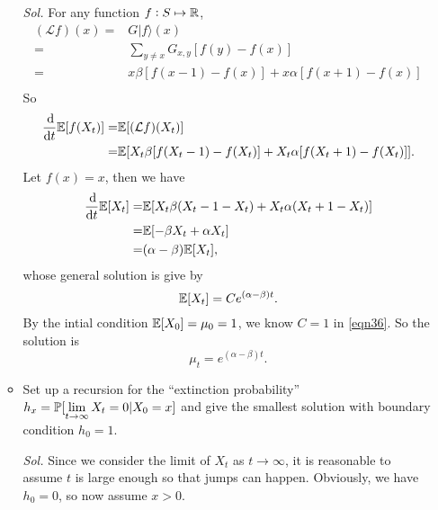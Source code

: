 \begin{enumerate}
\begin{itemize}
        \textit{ Sol. } For any function $f: S \mapsto \mathbb{R}$, 
        \begin{align*}
            (\mathcal{L}f)(x) = & G | f \rangle (x) \\ 
            = & \sum_{y \neq x} G_{x,y} [f(y) - f(x)] \\ 
            = & x \beta [f(x-1) - f(x)] + x \alpha [f(x+1) - f(x)] \\ 
        \end{align*}
        So 
        \begin{align*}
            \frac{\dif}{\dif t} \mbb{E} [f(X_t)] = & \mbb{E} [(\mathcal{L}f)(X_t)] \\ 
            = & \mbb{E} [X_t\beta [f(X_t - 1) - f(X_t)] + X_t \alpha [f(X_t + 1) - f(X_t)]].
        \end{align*}
        Let $f(x) = x$, then we have 
        \begin{align*}
            \frac{\dif}{\dif t} \mbb{E} [X_t] = & \mbb{E} [X_t \beta ( X_t - 1 - X_t) + X_t \alpha (X_t + 1 - X_t)] \\ 
            = & \mbb{E} [- \beta X_t + \alpha X_t] \\ 
            = & (\alpha - \beta)\mbb{E} [X_t], 
        \end{align*}
        whose general solution is give by 
        \begin{equation}\label{eqn36}
            \mathbb{E} [X_t] = C e^{(\alpha - \beta) t}.
        \end{equation}
        By the intial condition $\mathbb{E} [X_0] = \mu_0 =1$, we know $C = 1$ in \eqref{eqn36}. So the solution is 
        \begin{equation*}
            \mu_t = e^{(\alpha - \beta) t}.
        \end{equation*}

        \item Set up a recursion for the ``extinction probability'' $h_x = \mathbb{P}[\lim\limits_{t\to\infty}X_t = 0 | X_0 = x]$ and give the smallest solution with boundary condition $h_0 = 1$.
        
        \textit{ Sol. }
        Since we consider the limit of $X_t$ as $t \to \infty$, it is reasonable to assume $t$ is large enough so that jumps can happen. Obviously, we have $h_0 = 0$, so now assume $x > 0$. 
        

\end{itemize}
\end{enumerate}
